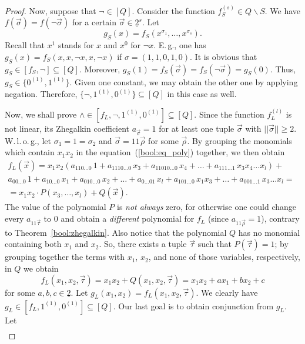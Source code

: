 \documentclass[12pt,notitlepage]{article}
\theoremstyle{plain}
\theoremstyle{definition}
\theoremstyle{plain}
\newcommand{\sbs}{\subseteq}
\renewcommand{\setminus}{\smallsetminus}
\newcommand{\ul}[1]{\underline{#1}}
\newcommand{\1}{\mathbf{1}}
\newcommand{\0}{\mathbf{0}}
\begin{document}
\begin{proof}
Now, suppose that $\neg \in [Q]$. Consider the function $f^{(s)}_S \in Q \setminus S$. We have $f(\vec{\sigma}) = f(\neg\vec{\sigma})$ for a certain $\vec\sigma \in \ul{2}^s$. Let 
$$g_S(x) = f_S(x^{\sigma_1},\ldots,x^{\sigma_s}).$$
Recall that $x^1$ stands for $x$ and $x^0$ for $\neg x$. E.\,g., one has $g_S(x) = f_S(x, x, \neg x, x, \neg x)$ if $\sigma = (1,1,0,1,0)$. It is obvious that $g_S \in [f_S, {\neg}] \sbs [Q]$. Moreover, $g_S(1) = f_S(\vec \sigma) = f_S(\neg\vec \sigma) = g_S(0)$. Thus, $g_S  \in \{0^{(1)}, 1^{(1)}\}$. Given one constant, we may obtain the other one by applying negation. Therefore, $\{{\neg}, 1^{(1)}, 0^{(1)}\} \sbs [Q]$ in this case as well.

Now, we shall prove ${\wedge} \in [f_L, {\neg}, 1^{(1)}, 0^{(1)}] \sbs  [Q]$. Since the function $f^{(l)}_L$ is not linear, its Zhegalkin coefficient $a_{\vec\sigma} = 1$ for at least one tuple $\vec \sigma$ with $||\vec{\sigma}|| \geq 2$. W.\,l.\,o.\,g., let $\sigma_1 = 1 = \sigma_2$ and $\vec{\sigma} = 11\vec{\rho}$ for some $\vec{\rho}$. By grouping the monomials which contain $x_1 x_2$ in the equation~(\ref{bool:eq_poly}) together, we then obtain
\begin{multline*}
f_L(\vec x) = x_1 x_2 (a_{110\ldots0}\, 1 + a_{1110\ldots0}\, x_3 + a_{11010\ldots0}\, x_4 + \ldots + a_{111\ldots1}\, x_3 x_4 \ldots x_l) +\phantom{b}\\
  a_{00\ldots0}\, 1 + a_{10\ldots0}\, x_1 + a_{010\ldots0}\, x_2 + \ldots + a_{0\ldots01}\, x_l + a_{101\ldots0}\, x_1 x_3 + \ldots + a_{001\ldots 1}\, x_3\ldots x_l =\phantom{b}\\
  	= x_1 x_2 \cdot P(x_3, \ldots, x_l) + Q(\vec x).
\end{multline*}
The value of the polynomial $P$ is \emph{not always} zero, for otherwise one could change every $a_{11\vec{\tau}}$ to $0$ and obtain a \emph{different} polynomial for $f_L$ (since $a_{11\vec{\rho}} = 1$), contrary to Theorem~\ref{bool:zhegalkin}. Also notice that the polynomial $Q$ has no monomial containing both $x_1$ and $x_2$. So, there exists a tuple $\vec{\tau}$ such that $P(\vec{\tau}) = 1$; by grouping together the terms with $x_1$, $x_2$, and none of those variables, respectively, in $Q$ we obtain
$$f_L(x_1,x_2,\vec{\tau}) = x_1 x_2 + Q(x_1, x_2, \vec \tau) = x_1 x_2 + a x_1 + b x_2 + c$$
for some $a, b, c \in \ul{2}$. Let $g_L(x_1, x_2) = f_L(x_1,x_2,\vec{\tau})$. We clearly have $g_L \in [f_L, 1^{(1)}, 0^{(1)}] \sbs [Q]$. Our last goal is to obtain conjunction from $g_L$. Let
\begin{multline*}

\end{multline*}
\end{proof}
\end{document}
